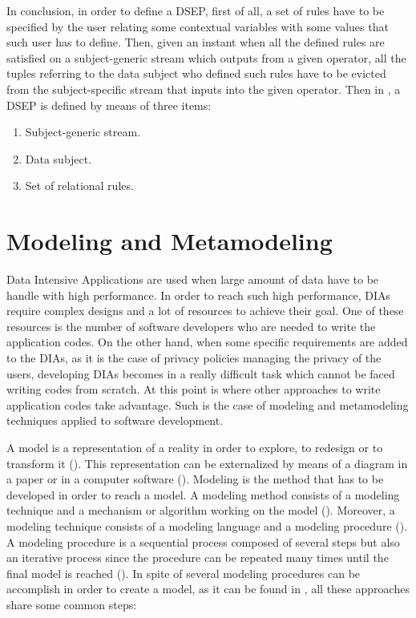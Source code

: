 In conclusion, in order to define a DSEP, first of all, a set of rules have to be specified by the user relating some contextual variables with some values that such user has to define. Then, given an instant when all the defined rules are satisfied on a subject-generic stream which outputs from a given operator, all the tuples referring to the data subject who defined such rules have to be evicted from the subject-specific stream that inputs into the given operator. Then in \cite{privacypoliciesarticle}, a DSEP is defined by means of three items:

\begin{enumerate}

\item Subject-generic stream.
\item Data subject.
\item Set of relational rules.

\end{enumerate}

\section{Modeling and Metamodeling}

\label{Modeling and Metamodeling}

Data Intensive Applications are used when large amount of data have to be handle with high performance. In order to reach such high performance, DIAs require complex designs and a lot of resources to achieve their goal. One of these resources is the number of software developers who are needed to write the application codes. On the other hand, when some specific requirements are added to the DIAs, as it is the case of privacy policies managing the privacy of the users, developing DIAs becomes in a really difficult task which cannot be faced writing codes from scratch. At this point is where other approaches to write application codes take advantage. Such is the case of modeling and metamodeling techniques applied to software development.

A model is a representation of a reality in order to explore, to redesign or to transform it (\cite{modelwebsite}). This representation can be externalized by means of a diagram in a paper or in a computer software (\cite{modelwebsite}). Modeling is the method that has to be developed in order to reach a model. A modeling method consists of a modeling technique and a mechanism or algorithm working on the model (\cite{metamodelwebsite}). Moreover, a modeling technique consists of a modeling language and a modeling procedure (\cite{metamodelwebsite}). A modeling procedure is a sequential process composed of several steps but also an iterative process since the procedure can be repeated many times until the final model is reached (\cite{metamodelwebsite}). In spite of several modeling procedures can be accomplish in order to create a model, as it can be found in \cite{modelwebsite}, all these approaches share some common steps:

